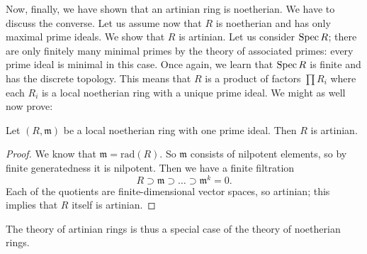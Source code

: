 Now, finally, we have shown that an artinian ring is noetherian. We have to
discuss the converse. Let us assume now that $R$ is noetherian and has only
maximal prime ideals. We show that $R$ is artinian. Let us consider $\operatorname{Spec} R$;
there are only finitely many minimal primes by the theory of associated
primes: every prime ideal is minimal in this case. Once again, we learn that $\operatorname{Spec} R$
is finite and has the discrete topology. This means that $R$ is a product of
factors $\prod R_i$ where each $R_i$ is a local noetherian ring with a unique
prime ideal. We might as well now prove:

\begin{lemma} 
Let $(R, \mathfrak{m})$ be a local noetherian ring with one prime ideal. Then
$R$ is artinian.
\end{lemma} 
\begin{proof} 
We know that $\mathfrak{m} = \mathrm{rad}(R)$. So $\mathfrak{m}$ consists of
nilpotent elements, so by finite generatedness it is nilpotent.  Then we have a
finite filtration
\[ R \supset \mathfrak{m} \supset \dots \supset \mathfrak{m}^k = 0.  \]
Each of the quotients are finite-dimensional vector spaces, so artinian; this
implies that $R$ itself is artinian. 
\end{proof} 



The theory of artinian rings is thus a special case of the theory of noetherian
rings.

